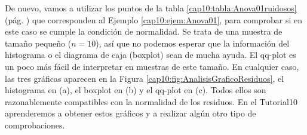 \begin{ejemplo}\label{cap10:ejem:AnalisisGraficoResiduos01}
De nuevo, vamos a utilizar los puntos de la tabla \ref{cap10:tabla:Anova01ruidosos} (pág. \pageref{cap10:tabla:Anova01ruidosos}) que corresponden al  Ejemplo \ref{cap10:ejem:Anova01}, para comprobar si en este caso se cumple la condición de normalidad. Se trata de una muestra de tamaño pequeño ($n=10$), así que no podemos esperar que la información del histograma o el diagrama de caja (boxplot) sean de mucha ayuda. El qq-plot es un poco más fácil de interpretar en muestras de este tamaño. En cualquier caso, las tres gráficas aparecen en la Figura \ref{cap10:fig:AnalisisGraficoResiduos}, el histograma en (a), el boxplot en (b) y el qq-plot en (c). Todos ellos son razonablemente compatibles con la normalidad de los residuos. En el Tutorial10 aprenderemos a obtener estos gráficos y a realizar algún otro tipo de comprobaciones.


\end{ejemplo}
